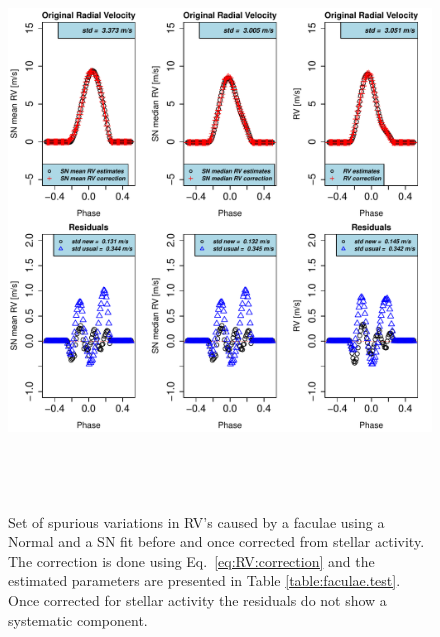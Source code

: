 \documentclass{aa}
\begin{document}
\begin{figure}[htbp]
   \centering
\includegraphics[height = 6in]{FACULAE_NEW_CORRECTION_[3]CorrectionActivity_RadialVelocity_vs_time.pdf} 
   \caption{Set of spurious variations in RV's caused by a faculae using a Normal and a SN fit before and once corrected from stellar activity. The correction is done using Eq.~\ref{eq:RV:correction} and the estimated parameters are presented in Table \ref{table:faculae.test}. Once corrected for stellar activity the residuals do not show a systematic component.}
    \label{fig:faculae.correction}
\end{figure}
\end{document}

